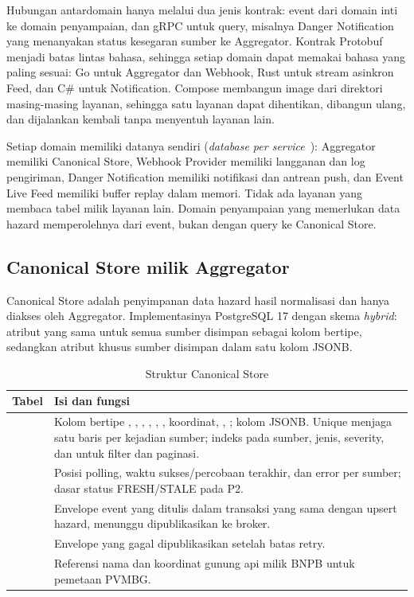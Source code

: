 Hubungan antardomain hanya melalui dua jenis kontrak: event
 dari domain inti ke domain penyampaian, dan gRPC
untuk query, misalnya Danger Notification yang menanyakan status kesegaran
sumber ke Aggregator. Kontrak Protobuf menjadi batas lintas bahasa, sehingga
setiap domain dapat memakai bahasa yang paling sesuai: Go untuk Aggregator dan
Webhook, Rust untuk stream asinkron Feed, dan C\# untuk Notification. Compose
membangun image dari direktori masing-masing layanan, sehingga satu layanan
dapat dihentikan, dibangun ulang, dan dijalankan kembali tanpa menyentuh
layanan lain.

Setiap domain memiliki datanya sendiri (\emph{database per service}~\cite{dbperservice}):
Aggregator memiliki Canonical Store, Webhook Provider memiliki langganan dan
log pengiriman, Danger Notification memiliki notifikasi dan antrean push, dan
Event Live Feed memiliki buffer replay dalam memori. Tidak ada layanan yang
membaca tabel milik layanan lain. Domain penyampaian yang memerlukan data
hazard memperolehnya dari event, bukan dengan query ke Canonical Store.

\subsection{Canonical Store milik Aggregator}

Canonical Store adalah penyimpanan data hazard hasil normalisasi dan hanya
diakses oleh Aggregator. Implementasinya PostgreSQL 17 dengan skema
\emph{hybrid}: atribut yang sama untuk semua sumber disimpan sebagai kolom
bertipe, sedangkan atribut khusus sumber disimpan dalam satu kolom JSONB.

\begin{table}[htbp]
    \centering
    \small
    \caption{Struktur Canonical Store}
    \begin{tabularx}{\textwidth}{@{}P{0.25\textwidth}X@{}}
        \toprule
        \textbf{Tabel} & \textbf{Isi dan fungsi} \\
        \midrule
         & Kolom bertipe , , , , , , koordinat, , ; kolom  JSONB. Unique  menjaga satu baris per kejadian sumber; indeks pada sumber, jenis, severity, dan  untuk filter dan paginasi. \\
         & Posisi polling, waktu sukses/percobaan terakhir, dan error per sumber; dasar status FRESH/STALE pada P2. \\
         & Envelope event yang ditulis dalam transaksi yang sama dengan upsert hazard, menunggu dipublikasikan ke broker. \\
         & Envelope yang gagal dipublikasikan setelah batas retry. \\
         & Referensi nama dan koordinat gunung api milik BNPB untuk pemetaan PVMBG. \\
        \bottomrule
    \end{tabularx}
\end{table}

